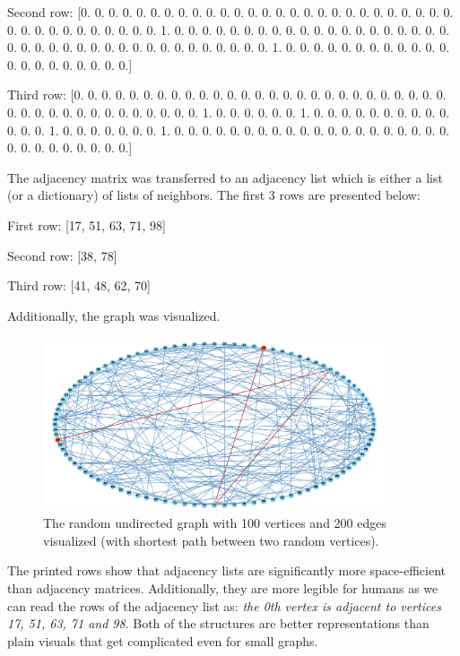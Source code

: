 \documentclass[12pt, a4paper]{article}
\begin{document}
\noindent
Second row: {\footnotesize [0. 0. 0. 0. 0. 0. 0. 0. 0. 0. 0. 0. 0. 0. 0. 0. 0. 0. 0. 0. 0. 0. 0. 0. 0. 0. 0. 0. 0. 0. 0. 0. 0. 0. 0. 0. 0. 0. 1. 0. 0. 0. 0. 0. 0. 0. 0. 0. 0. 0. 0. 0. 0. 0. 0. 0. 0. 0. 0. 0. 0. 0. 0. 0. 0. 0. 0. 0. 0. 0. 0. 0. 0. 0. 0. 0. 0. 0. 1. 0. 0. 0. 0. 0. 0. 0. 0. 0. 0. 0. 0. 0. 0. 0. 0. 0. 0. 0. 0. 0.]}

\noindent
Third row: {\footnotesize [0. 0. 0. 0. 0. 0. 0. 0. 0. 0. 0. 0. 0. 0. 0. 0. 0. 0. 0. 0. 0. 0. 0. 0. 0. 0. 0. 0. 0. 0. 0. 0. 0. 0. 0. 0. 0. 0. 0. 0. 0. 1. 0. 0. 0. 0. 0. 0. 1. 0. 0. 0. 0. 0. 0. 0. 0. 0. 0. 0. 0. 0. 1. 0. 0. 0. 0. 0. 0. 0. 1. 0. 0. 0. 0. 0. 0. 0. 0. 0. 0. 0. 0. 0. 0. 0. 0. 0. 0. 0. 0. 0. 0. 0. 0. 0. 0. 0. 0. 0.]}

The adjacency matrix was transferred to an adjacency list which is either a list (or a dictionary) of lists of neighbors. The first 3 rows are presented below:

\noindent
First row: {\footnotesize [17, 51, 63, 71, 98]}

\noindent
Second row: {\footnotesize [38, 78]}

\noindent
Third row: {\footnotesize [41, 48, 62, 70]}

Additionally, the graph was visualized.
\begin{figure}[!h]
\centering
\includegraphics[width=0.9\textwidth]{graph.png}
\caption{The random undirected graph with 100 vertices and 200 edges visualized (with shortest path between two random vertices).}
\end{figure}

The printed rows show that adjacency lists are significantly more space-efficient than adjacency matrices. Additionally, they are more legible for humans as we can read the rows of the adjacency list as: \textit{the 0th vertex is adjacent to vertices 17, 51, 63, 71 and 98}. Both of the structures are better representations than plain visuals that get complicated even for small graphs.
\end{document}
